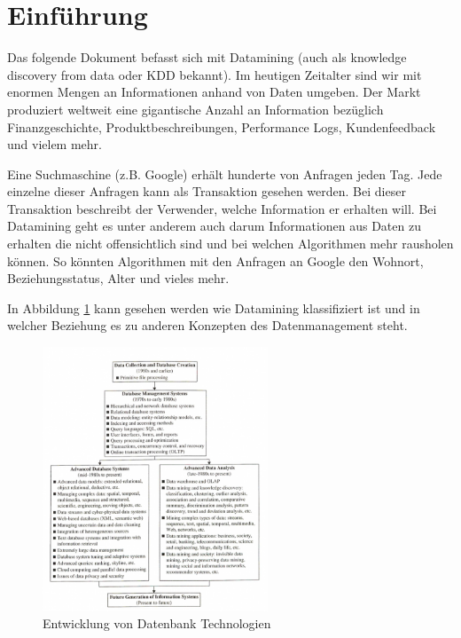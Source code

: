 
\section{Einführung}
\label{sec:intro}

Das folgende Dokument befasst sich mit Datamining (auch als knowledge discovery from data oder KDD bekannt). Im heutigen Zeitalter sind wir mit enormen Mengen an Informationen anhand von Daten umgeben. Der Markt produziert weltweit eine gigantische Anzahl an Information bezüglich Finanzgeschichte, Produktbeschreibungen, Performance Logs, Kundenfeedback und vielem mehr. 

Eine Suchmaschine (z.B. Google) erhält hunderte von Anfragen jeden Tag. Jede einzelne dieser Anfragen kann als Transaktion gesehen werden. Bei dieser Transaktion beschreibt der Verwender, welche Information er erhalten will. Bei Datamining geht es unter anderem auch darum Informationen aus Daten zu erhalten die nicht offensichtlich sind und bei welchen Algorithmen mehr rausholen können. So könnten Algorithmen mit den Anfragen an Google den Wohnort, Beziehungsstatus, Alter und vieles mehr.

In Abbildung \ref{fig:dbevolution} kann gesehen werden wie Datamining klassifiziert ist und in welcher Beziehung es zu anderen Konzepten des Datenmanagement steht.

\begin{figure}[!h]\centering
	\includegraphics[width=0.6\textwidth]{images/dbevolution}
	\caption{Entwicklung von Datenbank Technologien \cite{DataMiningConceptsAndTechniques}}
	\label{fig:dbevolution}
\end{figure}

